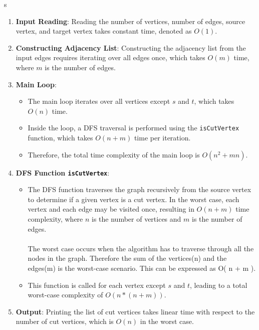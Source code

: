 s\documentclass{article}
\begin{document}
\begin{enumerate}
    \item \textbf{Input Reading}: Reading the number of vertices, number of edges, source vertex, and target vertex takes constant time, denoted as \( O(1) \).
    
    \item \textbf{Constructing Adjacency List}: Constructing the adjacency list from the input edges requires iterating over all edges once, which takes \( O(m) \) time, where \( m \) is the number of edges.

    \item \textbf{Main Loop}:
    \begin{itemize}
        \item The main loop iterates over all vertices except \( s \) and \( t \), which takes \( O(n) \) time.
        \item Inside the loop, a DFS traversal is performed using the \texttt{isCutVertex} function, which takes \( O(n + m) \) time per iteration.
        \item Therefore, the total time complexity of the main loop is \( O(n^2 + mn) \).
    \end{itemize}
    
    
    \item \textbf{DFS Function \texttt{isCutVertex}}:
    \begin{itemize}
        \item The DFS function traverses the graph recursively from the source vertex to determine if a given vertex is a cut vertex. In the worst case, each vertex and each edge may be visited once, resulting in \( O(n + m) \) time complexity, where \( n \) is the number of vertices and \( m \) is the number of edges. 
        \\ \\The worst case occurs when the algorithm has to traverse through all the nodes in the graph. Therefore the sum of the vertices(n) and the edges(m) is the worst-case scenario. This can be expressed as O( n + m ). \\
        \item This function is called for each vertex except \( s \) and \( t \), leading to a total worst-case complexity of \( O(n*(n + m)) \).
    \end{itemize}
    
    \item \textbf{Output}: Printing the list of cut vertices takes linear time with respect to the number of cut vertices, which is \( O(n) \) in the worst case.
\end{enumerate}
\end{document}
